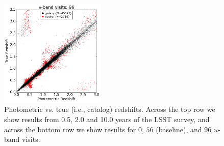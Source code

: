 \begin{figure}[h]
\begin{center}
\includegraphics[width=5cm]{figs/photoz/pztz_uvisits_96.png}
\caption{Photometric vs. true (i.e., catalog) redshifts. Across the top row we show results from
0.5, 2.0 and 10.0 years of the LSST survey, and across the bottom row we show results for $0$,
$56$ (baseline), and $96$ $u$-band visits. 
\label{fig:redshifts}}
\end{center}
\end{figure}

